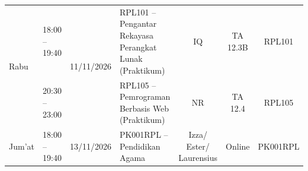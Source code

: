 \documentclass[11pt,a4paper]{article}
\begin{document}
\begin{tabularx}{\textwidth}{@{} l l c X c c c @{}}
	\multirow{2}{*}{Rabu}
	              & 18:00 -- 19:40 & \multirow{2}{*}{11/11/2026} & RPL101 -- Pengantar Rekayasa Perangkat Lunak (Praktikum)                 & IQ                      & TA 12.3B       & RPL101        \\
	              & 20:30 -- 23:00 &                             & RPL105 -- Pemrograman Berbasis Web (Praktikum)                           & NR                      & TA 12.4        & RPL105        \\
	\midrule

	Jum'at
	              & 18:00 -- 19:40 & 13/11/2026                  & PK001RPL -- Pendidikan Agama                                             & Izza/ Ester/ Laurensius & Online         & PK001RPL      \\

	\bottomrule
\end{tabularx}
\end{document}

